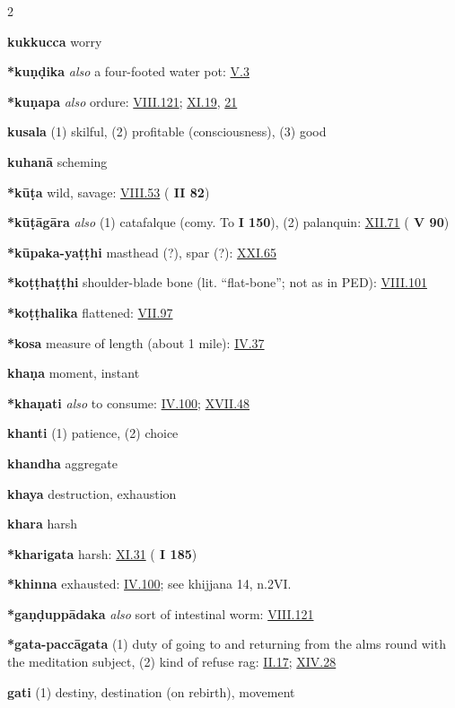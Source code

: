 \begin{multicols}{2}
\begin{vismHanging}
\par\textbf{kukkucca} worry
\par\textbf{*kuṇḍika} \emph{also }a four-footed water pot: \hyperlink{V.3}{V.3}{} 
\par\textbf{*kuṇapa} \emph{also }ordure: \hyperlink{VIII.121}{VIII.121}{}; \hyperlink{XI.19}{XI.19}{}, \hyperlink{XI.21}{21}{}
\par\textbf{kusala} (1) skilful, (2) profitable (consciousness), (3) good 
\par\textbf{kuhanā} scheming
\par\textbf{*kūṭa} wild, savage: \hyperlink{VIII.53}{VIII.53}{} (\textbf{\cite{M-a} II 82})
\par\textbf{*kūṭāgāra} \emph{also }(1) catafalque (comy. To \textbf{\cite{A} I 150}), (2) palanquin: \hyperlink{XII.71}{XII.71}{} (\textbf{\cite{M-a} V 90}) 
\par\textbf{*kūpaka-yaṭṭhi} masthead (?), spar (?): \hyperlink{XXI.65}{XXI.65}{} 
\par\textbf{*koṭṭhaṭṭhi} shoulder-blade bone (lit. “flat-bone”; not as in PED): \hyperlink{VIII.101}{VIII.101}{} 
\par\textbf{*koṭṭhalika} flattened: \hyperlink{VII.97}{VII.97}{}
\par\textbf{*kosa} measure of length (about 1 mile): \hyperlink{IV.37}{IV.37}{} 
\par\textbf{khaṇa} moment, instant
\par\textbf{*khaṇati} \emph{also }to consume: \hyperlink{IV.100}{IV.100}{}; \hyperlink{XVII.48}{XVII.48}{} 
\par\textbf{khanti} (1) patience, (2) choice 
\par\textbf{khandha} aggregate
\par\textbf{khaya} destruction, exhaustion
\par\textbf{khara} harsh
\par\textbf{*kharigata} harsh: \hyperlink{XI.31}{XI.31}{} (\textbf{\cite{M} I 185})
\par\textbf{*khinna} exhausted: \hyperlink{IV.100}{IV.100}{}; see khijjana 14, n.2VI. 
\par\textbf{*gaṇḍuppādaka} \emph{also }sort of intestinal worm: \hyperlink{VIII.121}{VIII.121}{} 
\par\textbf{*gata-paccāgata} (1) duty of going to and returning from the alms round with the meditation subject, (2) kind of refuse rag: \hyperlink{II.17}{II.17}{}; \hyperlink{XIV.28}{XIV.28}{} 
\par\textbf{gati} (1) destiny, destination (on rebirth), movement 

\end{vismHanging}
\end{multicols}

